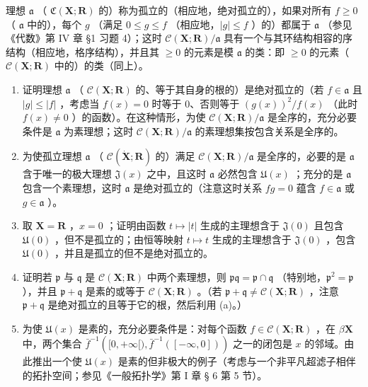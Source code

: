 理想 \(\mathfrak{a}\) （ \(\mathfrak{C}(\mathbf{X};\mathbf{R})\) 的）称为孤立的（相应地，绝对孤立的），如果对所有 \(f\geqslant 0\) （ \(\mathfrak{a}\) 中的），每个 \(g\) （满足 \(0\leqslant g\leqslant f\) （相应地，\(|g|\leqslant f\) ）的）都属于 \(\mathfrak{a}\) （参见《代数》第 IV 章 §1 习题 4）；这时 \(\mathcal{C}(\mathbf{X};\mathbf{R}) / \mathfrak{a}\) 具有一个与其环结构相容的序结构（相应地，格序结构），并且其 \(\geqslant 0\) 的元素是模 \(\mathfrak{a}\) 的类：即 \(\geqslant 0\) 的元素（ \(\mathcal{C}(\mathbf{X};\mathbf{R})\) 中的）的类（同上）。

\begin{enumerate}
\def\labelenumi{(\alph{enumi})}
\item
  证明理想 \(\mathfrak{a}\) （ \(\mathcal{C}(\mathbf{X};\mathbf{R})\) 的、等于其自身的根的）是绝对孤立的（若 \(f\in \mathfrak{a}\) 且 \(|g|\leqslant |f|\) ，考虑当 \(f(x) = 0\) 时等于 0、否则等于 \((g(x))^2 /f(x)\) （此时 \(f(x)\neq 0\) ）的函数）。在这种情形，为使 \(\mathcal{C}(\mathbf{X};\mathbf{R}) / \mathfrak{a}\) 是全序的，充分必要条件是 \(\mathfrak{a}\) 为素理想；这时 \(\mathcal{C}(\mathbf{X};\mathbf{R}) / \mathfrak{a}\) 的素理想集按包含关系是全序的。
\item
  为使孤立理想 \(\mathfrak{a}\) （ \(\mathcal{C}(\dot{\mathbf{X}};\mathbf{R})\) 的）满足 \(\mathcal{C}(\mathbf{X};\mathbf{R}) / \mathfrak{a}\) 是全序的，必要的是 \(\mathfrak{a}\) 含于唯一的极大理想 \(\mathfrak{J}(x)\) 之中，且这时 \(\mathfrak{a}\) 必然包含 \(\mathfrak{U}(x)\) ；充分的是 \(\mathfrak{a}\) 包含一个素理想，这时 \(\mathfrak{a}\) 是绝对孤立的（注意这时关系 \(fg = 0\) 蕴含 \(f\in \mathfrak{a}\) 或 \(g\in \mathfrak{a}\) ）。
\item
  取 \(\mathbf{X} = \mathbf{R}\) ，\(x = 0\) ；证明由函数 \(t \mapsto |t|\) 生成的主理想含于 \(\mathfrak{J}(0)\) 且包含 \(\mathfrak{U}(0)\) ，但不是孤立的；由恒等映射 \(t \mapsto t\) 生成的主理想含于 \(\mathfrak{J}(0)\) ，包含 \(\mathfrak{U}(0)\) ，并且是孤立的但不是绝对孤立的。
\item
  证明若 \(\mathfrak{p}\) 与 \(\mathfrak{q}\) 是 \(\mathcal{C}(\mathbf{X};\mathbf{R})\) 中两个素理想，则 \(\mathfrak{pq} = \mathfrak{p} \cap \mathfrak{q}\) （特别地，\(\mathfrak{p}^2 = \mathfrak{p}\) ），并且 \(\mathfrak{p} + \mathfrak{q}\) 是素的或等于 \(\mathcal{C}(\mathbf{X};\mathbf{R})\) 。（若 \(\mathfrak{p} + \mathfrak{q} \neq \mathcal{C}(\mathbf{X};\mathbf{R})\) ，注意 \(\mathfrak{p} + \mathfrak{q}\) 是绝对孤立的且等于它的根，然后利用 (a)。）
\item
  为使 \(\mathfrak{U}(x)\) 是素的，充分必要条件是：对每个函数 \(f\in\mathcal{C}(\mathbf{X};\mathbf{R})\) ，在 \(\beta\mathbf{X}\) 中，两个集合 \(\bar{f}^{-1}\left([0,+\infty[),\bar{f}^{-1}([- \infty,0])\right)\) 之一的闭包是 \(x\) 的邻域。由此推出一个使 \(\mathfrak{U}(x)\) 是素的但非极大的例子（考虑与一个非平凡超滤子相伴的拓扑空间；参见《一般拓扑学》第 I 章 § 6 第 5 节）。

\end{enumerate}
